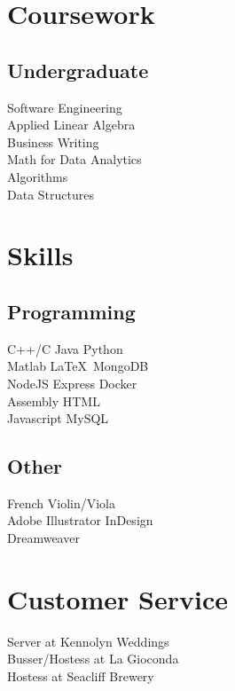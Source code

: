 \documentclass[]{deedy-resume-openfont}
\begin{document}
\begin{minipage}[t]{0.33\textwidth}
\sectionsep

\section{Coursework}
\subsection{Undergraduate}
Software Engineering\\
Applied Linear Algebra \\
Business Writing \\
Math for Data Analytics \\
Algorithms \\
Data Structures \\
\sectionsep


\section{Skills}
\subsection{Programming}
C++/C \textbullet{}   Java \textbullet{} Python \\ Matlab\textbullet{} \LaTeX\textbullet{}\ MongoDB \\ 
NodeJS\textbullet{} Express \textbullet{} Docker \\

Assembly \textbullet{} HTML \\
Javascript \textbullet{} MySQL
\sectionsep

\subsection{Other}
French \textbullet{}   Violin/Viola \\
Adobe Illustrator \textbullet{} InDesign \\ 
Dreamweaver\\ 


\section{Customer Service}
Server at Kennolyn Weddings\\
Busser/Hostess at La Gioconda\\
Hostess at Seacliff Brewery \\

\sectionsep

%
%

\end{minipage} 
\end{document}
